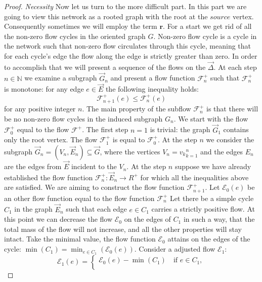 \documentclass[12pt]{article}
\renewcommand{\cal}[1]{\mathcal{#1}}
\renewcommand{\leq}{\leqslant}
\theoremstyle{definition}
\newcommand{\flowpos}{\mathcal{F}^{+}}
\newcommand{\flowposn}[1]{\mathcal{F}_{#1}^{+}}
\newcommand{\source}{\mathit{source}}
\renewcommand{\root}{\mathbf{r}}
\newcommand{\onet}{\vec{\Delta}}
\numberwithin{remark}{section}
\numberwithin{theorem}{section}
\numberwithin{prop}{section}
\numberwithin{equation}{section}
\numberwithin{lemma}{section}
\numberwithin{prop_under_lemma}{lemma}
\begin{document}
\begin{proof}
      \noindent\textit{Necessity}
      Now let us turn to the more difficult part.
      In this part we are going to view this network as a rooted graph with the root at the $\source$ vertex.
      Consequently sometimes we will employ the term $\root$.
      For a start we get rid of all the non-zero flow cycles in the oriented graph $G$.
      Non-zero flow cycle is a cycle in the network such that non-zero flow circulates through this cycle,
      meaning that for each cycle's edge the flow along the edge is strictly greater than zero.
      In order to accomplish that we will present a sequence of the flows on the $\onet$.
      At each step $n \in \mathbb{N}$ we examine a subgraph $\vec{G}_n$ and present a flow function $\flowposn{n}$
        such that $\flowposn{n}$ is monotone: for any edge $e \in \vec{E}$ the following inequality holds:
      \[
        \flowposn{n+1}(e) \leq \flowposn{n}(e)
      \]
      for any positive integer $n$.
      The main property of the subflow $\flowposn{n}$ is that there will be no non-zero flow cycles in the induced subgraph
      $G_n$.
      We start with the flow $\flowposn{0}$ equal to the flow $\flowpos$.
      The first step $n = 1$ is trivial: the graph $\vec{G}_1$ contains only the root vertex.
      The flow $\flowposn{1}$ is equal to $\flowposn{0}$.
      At the step $n$ we consider the subgraph $\vec{G}_n = (V_n, \vec{E}_n) \subseteq \vec{G}$, where the vertices
        $V_n = {v_k}_{k=1}^n$ and the edges $E_n$ are the edges from $\vec{E}$ incident to the $V_n$.
      At the step $n$ suppose we have already established the flow function $\flowposn{n}: \vec{E}_{n} \to R^{+}$ for which
        all the inequalities above are satisfied.
      We are aiming to construct the flow function $\flowposn{n+1}$.
      Let $\cal{E}_0(e)$ be an other flow function  equal to the flow function $\flowposn{n}$
      Let there be a simple cycle $C_1$ in the graph $\vec{E}_n$ such that each edge $e \in C_1$ carries
        a strictly positive flow.
      At this point we can decrease the flow $\cal{E}_0$ on the edges of $C_1$ in such a way, that the total mass
        of the flow will not increase, and all the other properties will stay intact.
      Take the minimal value, the flow function $\cal{E}_0$
        attains on the edges of the cycle: $\displaystyle\min(C_1) = \min_{e \in C_1}\left(\cal{E}_0(e)\right)$.
      Consider a adjusted flow $\cal{E}_1$:
      \begin{equation*}
        \cal{E}_1(e) =
        \begin{cases}
          \cal{E}_0(e) - \min(C_1) \quad \text{if } e \in C_1,\\

\end{cases}
\end{equation*}
\end{proof}
\end{document}
